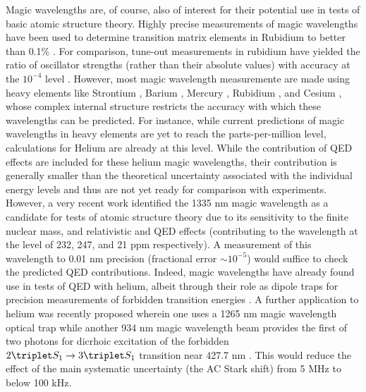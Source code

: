 	Magic wavelengths are, of course, also of interest for their potential use in tests of basic atomic structure theory.
	Highly precise measurements of magic wavelengths have been used to determine transition matrix elements in Rubidium to better than 0.1\% \cite{Herold12}.
	For comparison, tune-out measurements in rubidium have yielded the ratio of oscillator strengths (rather than their absolute values) with accuracy at the $10^{-4}$ level \cite{Leonard15}.
	However, most magic wavelength measuremente are made using heavy elements like Strontium , Barium \cite{Chanu20}, Mercury \cite{Yi11}, Rubidium \cite{Herold12}, and Cesium \cite{Yoon19}, whose complex internal structure restricts the accuracy with which these wavelengths can be predicted.
	For instance, while current predictions of magic wavelengths in heavy elements are yet to reach the parts-per-million level, calculations for Helium are already at this level\cite{Wu18,Zhang21_magic}.
	While the contribution of QED effects are included for these helium magic wavelengths, their contribution is generally smaller than the theoretical uncertainty associated with the individual energy levels and thus are not yet ready for comparison with experiments.
	However, a very recent work identified the 1335 nm magic wavelength as a candidate for tests of atomic structure theory due to its sensitivity to the finite nuclear mass, and relativistic and QED effects \cite{Zhang21_magic} (contributing to the wavelength at the level of 232, 247, and 21 ppm respectively).
	A measurement of this wavelength to 0.01 nm precision (fractional error $\sim10^{-5}$) would suffice to check the predicted QED contributions.
	Indeed, magic wavelengths have already found use in tests of QED with helium, albeit through their role as dipole traps for precision measurements of forbidden transition energies \cite{Regnelink18}.
	A further application to helium was recently proposed wherein one uses a 1265 nm magic wavelength optical trap while another 934 nm magic wavelength beam provides the first of two photons for dicrhoic excitation of the  forbidden $2\triplet S_1\rightarrow 3\triplet S_1$ transition near 427.7 nm \cite{Thomas20, Zhang21_forbidden}.
	This would reduce the effect of the main systematic uncertainty (the AC Stark shift) from 5 MHz to below 100 kHz.


